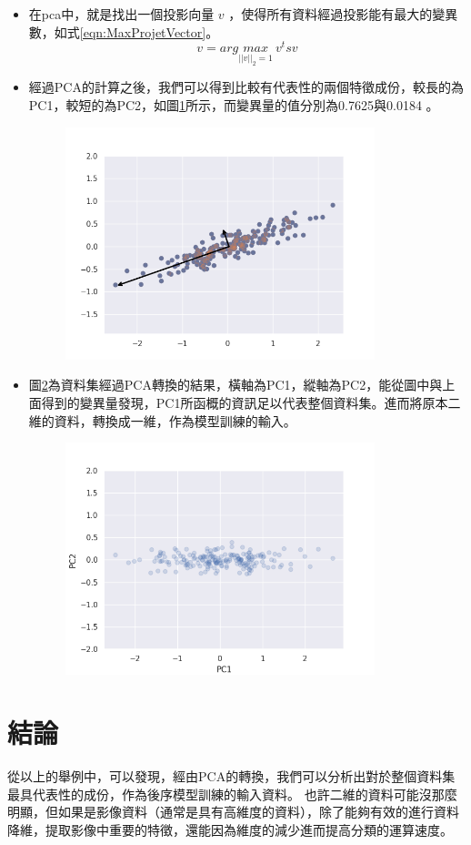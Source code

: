 \begin{itemize}
	\item
		在pca中，就是找出一個投影向量 \(v\) ，使得所有資料經過投影能有最大的變異數，如式\ref{eqn:MaxProjetVector}。
		\begin{equation}
			\label{eqn:MaxProjetVector}
			v = arg \underset{||v||_2=1}{max}\  v^tsv			
		\end{equation}


		\newpage
	\item
		經過PCA的計算之後，我們可以得到比較有代表性的兩個特徵成份，較長的為PC1，較短的為PC2，如圖\ref{fig:Pc1AndPc2}所示，而變異量的值分別為0.7625與0.0184 。


	      \begin{figure}[H]
		      \centering
		      \includegraphics[width=9cm]{pic/pca_with_pca_axis.png}
		      \caption{}
		      \label{fig:Pc1AndPc2}
	      \end{figure}


	\item
	圖\ref{fig:PcaTransform}為資料集經過PCA轉換的結果，橫軸為PC1，縱軸為PC2，能從圖中與上面得到的變異量發現，PC1所函概的資訊足以代表整個資料集。進而將原本二維的資料，轉換成一維，作為模型訓練的輸⼊。


	      \begin{figure}[H]
		      \centering
		      \includegraphics[width=9cm]{pic/pca_transform.png}
		      \caption{}
		      \label{fig:PcaTransform}
	      \end{figure}

\end{itemize}


\section {結論}
從以上的舉例中，可以發現，經由PCA的轉換，我們可以分析出對於整個資料集最具代表性的成份，作為後序模型訓練的輸⼊資料。
也許二維的資料可能沒那麼明顯，但如果是影像資料（通常是具有高維度的資料），除了能夠有效的進行資料降維，提取影像中重要的特徵，還能因為維度的減少進而提高分類的運算速度。

